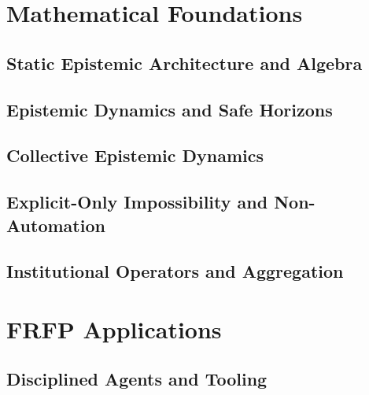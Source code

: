 \documentclass[preprints,accept]{Definitions/mdpi}
\theoremstyle{definition}
\begin{document}

\pagebreak
\appendix
\section{Mathematical Foundations}
\label{app:math-foundations}
\subsection{Static Epistemic Architecture and Algebra} %
\label{app:static-epistemic}

\subsection{Epistemic Dynamics and Safe Horizons} %
\label{app:dynamics}

\subsection{Collective Epistemic Dynamics} %
\label{app:collective}

\subsection{Explicit-Only Impossibility and Non-Automation} %
\label{app:impossibility}

\subsection{Institutional Operators and Aggregation} %
\label{app:institutions-math}


\pagebreak
\section{FRFP Applications}
\label{app:applications}

\subsection{Disciplined Agents and Tooling} %
\label{app:disciplined-agents}

\end{document}
